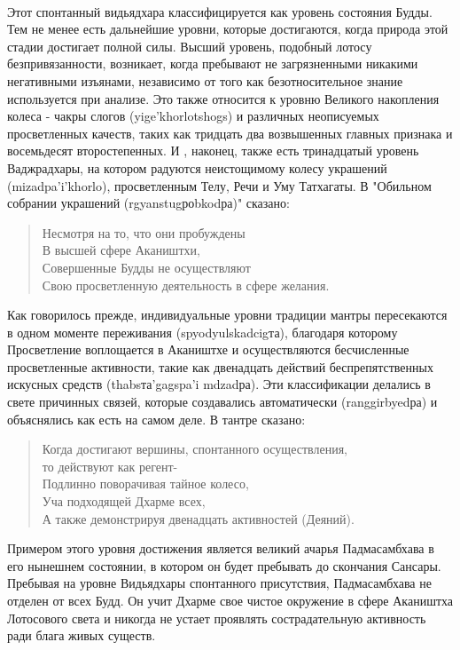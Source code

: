 \\
Этот спонтанный видьядхара классифицируется как уровень состояния Будды. Тем не 
менее есть дальнейшие уровни, которые достигаются, когда природа этой стадии достигает 
полной силы. Высший уровень, подобный лотосу безпривязанности, возникает, когда 
пребывают не загрязненными никакими негативными изъянами, независимо от того как 
безотносительное знание используется при анализе. Это также относится к уровню Великого 
накопления колеса - чакры слогов (yige'khorlotshogs) и различных неописуемых 
просветленных качеств, таких как тридцать два возвышенных главных признака и 
восемьдесят второстепенных. И , наконец, также есть тринадцатый уровень Ваджрадхары, на 
котором радуются неистощимому колесу украшений (mizadpa'i'khorlo), просветленным 
Телу, Речи и Уму Татхагаты. В "Обильном собрании украшений (rgyanstugроbkodра)" 
сказано:
\begin{verse}
Несмотря на то, что они пробуждены\\
В высшей сфере Акаништхи,\\
Совершенные Будды не осуществляют\\
Свою просветленную деятельность в сфере желания.
\end{verse}
Как говорилось прежде, индивидуальные уровни традиции мантры пересекаются в
одном моменте переживания (spyodyulskadcigта), благодаря которому Просветление
воплощается в Акаништхе и осуществляются бесчисленные просветленные активности, 
такие как двенадцать действий беспрепятственных искусных средств (thabsта'gagspa'i
mdzadра). Эти классификации делались в свете причинных связей, которые создавались 
автоматически (ranggirbyedра) и объяснялись как есть на самом деле. В тантре сказано:
\begin{verse}
Когда достигают вершины, спонтанного осуществления,\\
то действуют как регент-\\
Подлинно поворачивая тайное колесо,\\
Уча подходящей Дхарме всех,\\
А также демонстрируя двенадцать активностей (Деяний).
\end{verse}
Примером этого уровня достижения является великий ачарья Падмасамбхава в его 
нынешнем состоянии, в котором он будет пребывать до скончания Сансары. Пребывая на
уровне Видьядхары спонтанного присутствия, Падмасамбхава не отделен от всех Будд. Он 
учит Дхарме свое чистое окружение в сфере Акаништха Лотосового света и никогда не 
устает проявлять сострадательную активность ради блага живых существ.\\
